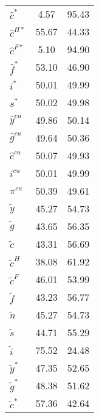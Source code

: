 \begin{center}
\begin{longtable}{lcc}
${\hat c^*}            $	 & 	              4.57	 & 	             95.43 \\ 
${\hat c^{H*}}         $	 & 	             55.67	 & 	             44.33 \\ 
${\hat c^{F*}}         $	 & 	              5.10	 & 	             94.90 \\ 
${\hat f^*}            $	 & 	             53.10	 & 	             46.90 \\ 
${i^*}                 $	 & 	             50.01	 & 	             49.99 \\ 
${s^*}                 $	 & 	             50.02	 & 	             49.98 \\ 
${\hat y^{cu}}         $	 & 	             49.86	 & 	             50.14 \\ 
${\hat g^{cu}}         $	 & 	             49.64	 & 	             50.36 \\ 
${\hat c^{cu}}         $	 & 	             50.07	 & 	             49.93 \\ 
${i^{cu}}              $	 & 	             50.01	 & 	             49.99 \\ 
${\pi^{cu}}            $	 & 	             50.39	 & 	             49.61 \\ 
${\tilde y}            $	 & 	             45.27	 & 	             54.73 \\ 
${\tilde g}            $	 & 	             43.65	 & 	             56.35 \\ 
${\tilde c}            $	 & 	             43.31	 & 	             56.69 \\ 
${\tilde c^H}          $	 & 	             38.08	 & 	             61.92 \\ 
${\tilde c^F}          $	 & 	             46.01	 & 	             53.99 \\ 
${\tilde f}            $	 & 	             43.23	 & 	             56.77 \\ 
${\tilde n}            $	 & 	             45.27	 & 	             54.73 \\ 
${\tilde s}            $	 & 	             44.71	 & 	             55.29 \\ 
${\tilde i}            $	 & 	             75.52	 & 	             24.48 \\ 
${\tilde y^*}          $	 & 	             47.35	 & 	             52.65 \\ 
${\tilde g^*}          $	 & 	             48.38	 & 	             51.62 \\ 
${\tilde c^*}          $	 & 	             57.36	 & 	             42.64 \\ 

\end{longtable}
\end{center}
